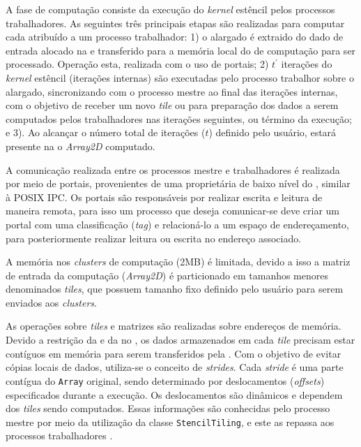 A fase de computação consiste da execução do \emph{kernel} estêncil pelos processos trabalhadores. As seguintes três principais etapas são realizadas para computar cada \tile atribuído a um processo trabalhador: 1) o \tile alargado é extraido do dado de entrada alocado na \lpddr e transferido para a memória local do \cluster de computação para ser processado. Operação esta, realizada com o uso de portais; 2) $t^\prime$ iterações do \emph{kernel} estêncil (iterações internas) são executadas pelo processo trabalhor sobre o \tile alargado, sincronizando com o processo mestre ao final das iterações internas, com o objetivo de receber um novo \textit{tile} ou para preparação dos dados a serem computados pelos trabalhadores nas iterações seguintes, ou término da execução; e 3). Ao alcançar o número total de iterações ($t$) definido pelo usuário, estará presente na \lpddr o \textit{Array2D} computado.

A comunicação realizada entre os processos mestre e trabalhadores é realizada por meio de portais, provenientes de uma \api proprietária de baixo nível do \mppa, similar à POSIX IPC. Os portais são responsáveis por realizar escrita e leitura de maneira remota, para isso um processo que deseja comunicar-se deve criar um portal com uma classificação (\textit{tag}) e relacioná-lo a um espaço de endereçamento, para posteriormente realizar leitura ou escrita no endereço associado.

A memória nos \textit{clusters} de computação (2MB) é limitada, devido a isso a matriz de entrada da computação (\textit{Array2D}) é particionado em tamanhos menores denominados \textit{tiles}, que possuem tamanho fixo definido pelo usuário para serem enviados aos \textit{clusters}.

As operações sobre \textit{tiles} e matrizes são realizadas sobre endereços de memória. Devido a restrição da \api e da \noc no \mppa, os dados armazenados em cada \textit{tile} precisam estar contíguos em memória para serem transferidos
pela \noc. Com o objetivo de evitar cópias locais de dados, utiliza-se o conceito de \textit{strides}. Cada \textit{stride} é uma parte contígua do \texttt{Array} original, sendo determinado por deslocamentos (\textit{offsets}) especificados durante a
execução. Os deslocamentos são dinâmicos e dependem dos \textit{tiles} sendo computados. Essas informações são conhecidas pelo processo mestre por meio da utilização da classe \texttt{StencilTiling}, e este as repassa aos processos trabalhadores \cite{Podesta:TCC}.


